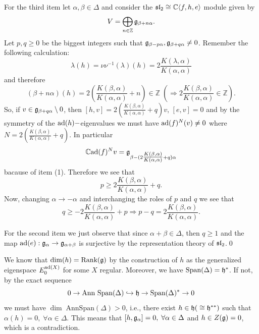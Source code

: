 For the third item let $\alpha,\beta\in\Delta$ and consider the $\mathfrak{sl}_2\cong\mathbb{C}\langle f,h,e\rangle$ module given by
\begin{equation}
    V=\bigoplus_{n\in\mathbb{Z}}\mathfrak{g}_{\beta+n\alpha}.
\end{equation}
Let $p,q\geq0$ be the biggest integers such that $\mathfrak{g}_{\beta-p\alpha},\mathfrak{g}_{\beta+q\alpha}\neq0$. 
Remember the following calculation:
\begin{equation}
    \lambda(h)=\nu\nu^{-1}(\lambda)(h)=2\frac{K(\lambda,\alpha)}{K(\alpha,\alpha)}
\end{equation}
and therefore
\begin{equation}
    (\beta+n\alpha)(h)=2(\frac{K(\beta,\alpha)}{K(\alpha,\alpha)}+n)\in\mathbb{Z}
    \;(\Rightarrow 2\frac{K(\beta,\alpha)}{K(\alpha,\alpha)}\in\mathbb{Z}).
\end{equation}
So, if $v\in \mathfrak{g}_{\beta+q\alpha}\setminus0$, then $[h,v]=2(\tfrac{K(\beta,\alpha)}{K(\alpha,\alpha)}+q)v$, 
$[e,v]=0$ and by the symmetry of the $\text{ad}(h)-$eigenvalues we must have $\text{ad}(f)^N(v)\neq0$ 
where $N=2(\tfrac{K(\beta,\alpha)}{K(\alpha,\alpha)}+q)$. In particular 
\begin{equation}
    \mathbb{C}\text{ad}(f)^Nv=\mathfrak{g}_{\beta-(2\tfrac{K(\beta,\alpha)}{K(\alpha,\alpha)}+q)\alpha}
\end{equation}
bacause of item (1). Therefore we see that 
\begin{equation}
    p\geq 2\frac{K(\beta,\alpha)}{K(\alpha,\alpha)}+q.
\end{equation}
Now, changing $\alpha\to -\alpha$ and interchanging the roles of $p$ and $q$ we see that 
\begin{equation}
    q\geq -2\frac{K(\beta,\alpha)}{K(\alpha,\alpha)}+p\Rightarrow p-q = 2\frac{K(\beta,\alpha)}{K(\alpha,\alpha)}.
\end{equation}

For the second item we just observe that since $\alpha+\beta\in\Delta$, then $q\geq1$ and the map 
$\text{ad}(e):\mathfrak{g}_\alpha\to\mathfrak{g}_{\alpha+\beta}$ is surjective by the representation theory of $\mathfrak{sl}_2$.\qed

\begin{dang}
    \begin{remark}
        We know that $\dim(h)=\text{Rank}(\mathfrak{g})$ by the construction of $h$ as the generalized eigenspace $E_0^{\text{ad}(X)}$
        for some $X$ regular. Moreover, we have $\text{Span}(\Delta)=\mathfrak{h}^*$. If not, by the exact sequence 
        \begin{equation}
            0\to\text{Ann }\text{Span}(\Delta)\hookrightarrow \mathfrak{h}\to \text{Span}(\Delta)^*\to0
        \end{equation}
        we must have $\dim\;\text{Ann}\text{Span}(\Delta)>0$, i.e., there exist $h\in\mathfrak{h}(\;\cong\mathfrak{h}^{**})$ such that 
        $\alpha(h)=0,\;\forall \alpha\in\Delta$. This means that $[h,\mathfrak{g}_\alpha]=0,\;\forall\alpha\in\Delta$ and
        $h\in Z(\mathfrak{g})=0$, which is a contradiction.
    \end{remark}
\end{dang}

